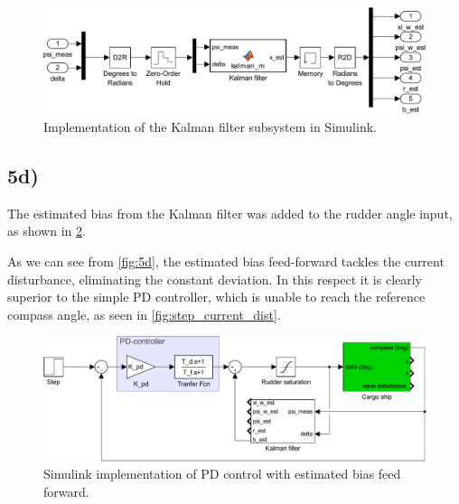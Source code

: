 

\begin{figure}
    \centering
    \includegraphics[width=\textwidth]{images/oppg5/c_kalman.pdf}
    \caption{Implementation of the Kalman filter subsystem in Simulink.}
    \label{fig:kalman_subsys}
\end{figure}

\subsection{5d)}

The estimated bias from the Kalman filter was added to the rudder angle input, as shown in \cref{fig:bias_ff}.

As we can see from \cref{fig:5d}, the estimated bias feed-forward tackles the current disturbance, eliminating the constant deviation. In this respect it is clearly superior to the simple PD controller, which is unable to reach the reference compass angle, as seen in \cref{fig:step_current_dist}.

\begin{figure}
    \centering
    \includegraphics[width=\textwidth]{images/oppg5/bias_FF.pdf}
    \caption{Simulink implementation of PD control with estimated bias feed forward.}
    \label{fig:bias_ff}
\end{figure}

